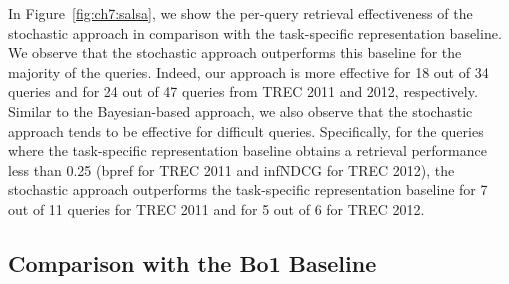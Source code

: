 \documentclass[1p]{elsarticle}
\begin{document}

In Figure~\ref{fig:ch7:salsa}, we show the per-query retrieval effectiveness of the stochastic approach in comparison with the task-specific representation baseline. We observe that the stochastic approach outperforms this baseline for the majority of the queries. Indeed, our approach is more effective for 18 out of 34 queries and for 24 out of 47 queries from TREC 2011 and 2012, respectively. Similar to the Bayesian-based approach, we also observe that the stochastic approach tends to be effective for difficult queries. 
Specifically, for the queries where the task-specific representation baseline obtains a retrieval performance less than 0.25 (bpref for TREC 2011 and infNDCG for TREC 2012), the stochastic approach outperforms the task-specific representation baseline for 7 out of 11 queries for TREC 2011 and for 5 out of 6 for TREC 2012. 

% 

\subsection{Comparison with the Bo1 Baseline}\label{c7sAnalysisBo1}
\end{document}
